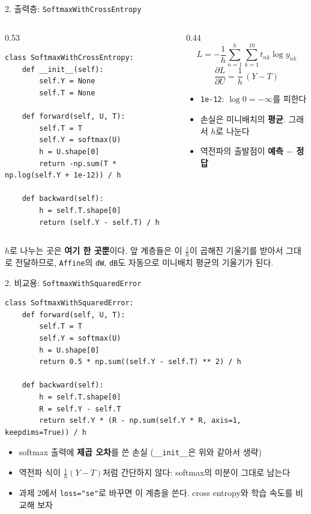 \documentclass[aspectratio=169,11pt]{beamer}
\newcommand{\pd}[2]{\frac{\partial #1}{\partial #2}}
\newcommand{\code}[1]{\texttt{#1}}
\begin{document}
\begin{frame}[fragile]{2. 출력층: \code{SoftmaxWithCrossEntropy}}
\begin{columns}[T,onlytextwidth]
\begin{column}{0.53\textwidth}
\begin{lstlisting}[basicstyle=\ttfamily\fontsize{7.5}{8.4}\selectfont]
class SoftmaxWithCrossEntropy:
    def __init__(self):
        self.Y = None
        self.T = None

    def forward(self, U, T):
        self.T = T
        self.Y = softmax(U)
        h = U.shape[0]
        return -np.sum(T * np.log(self.Y + 1e-12)) / h

    def backward(self):
        h = self.T.shape[0]
        return (self.Y - self.T) / h
\end{lstlisting}
\end{column}
\begin{column}{0.44\textwidth}
\small
\[
L=-\frac1h\sum_{n=1}^{h}\sum_{k=1}^{10}t_{nk}\log y_{nk}
\]
\[
\pd{L}{U}=\frac{1}{h}\,(Y-T)
\]
\begin{itemize}
\item \code{1e-12}: $\log 0=-\infty$를 피한다
\item 손실은 미니배치의 \textbf{평균}. 그래서 $h$로 나눈다
\item 역전파의 출발점이 \textbf{예측 $-$ 정답}
\end{itemize}
\end{column}
\end{columns}
\begin{keybox}
\small
$h$로 나누는 곳은 \textbf{여기 한 곳뿐}이다. 앞 계층들은 이 $\frac1h$이 곱해진 기울기를 받아서 그대로 전달하므로,
\code{Affine}의 \code{dW}, \code{dB}도 자동으로 미니배치 평균의 기울기가 된다.
\end{keybox}
\end{frame}

\begin{frame}[fragile]{2. 비교용: \code{SoftmaxWithSquaredError}}
\begin{lstlisting}
class SoftmaxWithSquaredError:
    def forward(self, U, T):
        self.T = T
        self.Y = softmax(U)
        h = U.shape[0]
        return 0.5 * np.sum((self.Y - self.T) ** 2) / h

    def backward(self):
        h = self.T.shape[0]
        R = self.Y - self.T
        return self.Y * (R - np.sum(self.Y * R, axis=1, keepdims=True)) / h
\end{lstlisting}
\begin{itemize}
\item softmax 출력에 \textbf{제곱 오차}를 쓴 손실 (\code{\_\_init\_\_}은 위와 같아서 생략)
\item 역전파 식이 $\frac1h(Y-T)$처럼 간단하지 않다: softmax의 미분이 그대로 남는다
\item 과제 2에서 \code{loss="se"}로 바꾸면 이 계층을 쓴다. cross entropy와 학습 속도를 비교해 보자
\end{itemize}
\end{frame}
\end{document}
